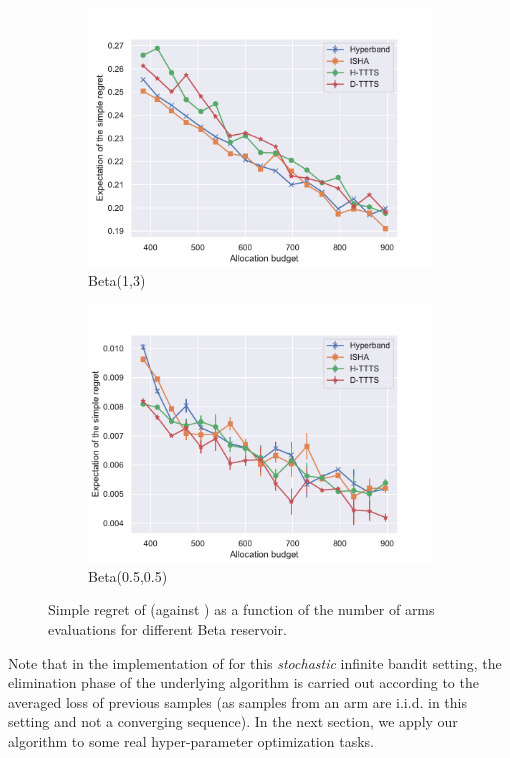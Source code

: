 \begin{figure}[ht]
\begin{subfigure}[t]{0.33\textwidth}
    \centering\includegraphics[width=\textwidth]{Chapter6/img/infinite/beta_1_3.pdf}
    \caption{Beta(1,3)}
  \end{subfigure}%
  \begin{subfigure}[t]{0.33\textwidth}
    \centering\includegraphics[width=\textwidth]{Chapter6/img/infinite/beta_-5_-5.pdf}
    \caption{Beta(0.5,0.5)}
  \end{subfigure}
  \caption{Simple regret of \DTTTS (against \Hyperband) as a function of the number of arms evaluations for different Beta reservoir.}
  \label{fig:dttts}
\end{figure}

Note that in the implementation of \Hyperband for this \emph{stochastic} infinite bandit setting, the elimination phase of the underlying \SHA algorithm is carried out according to the averaged loss of previous samples (as samples from an arm are i.i.d. in this setting and not a converging sequence). In the next section, we apply our algorithm to some real hyper-parameter optimization tasks. 

